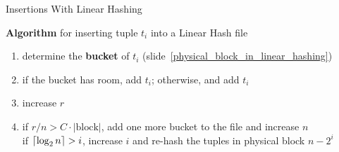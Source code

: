 %
%
\begin{frame}{Insertions With Linear Hashing}

\textbf{Algorithm} for inserting tuple $t_i$ into a Linear Hash file

\begin{enumerate}[label=(\arabic*)]
\item determine the \textbf{bucket} of $t_i$ (slide~\ref{physical_block_in_linear_hashing})
\item if the bucket has room, add $t_i$; otherwise,  and add $t_i$
\item \alert{increase $r$}
\item \alert{if $r/n > C\cdot|\text{block}|$}, add one more bucket to the file and increase $n$ \\[0.5em]\alert{if $\lceil\log_2 n\rceil>i$}, increase $i$ and \alert{re-hash} the tuples in physical block $n-2^i$
\end{enumerate}
\end{frame}

%
%

